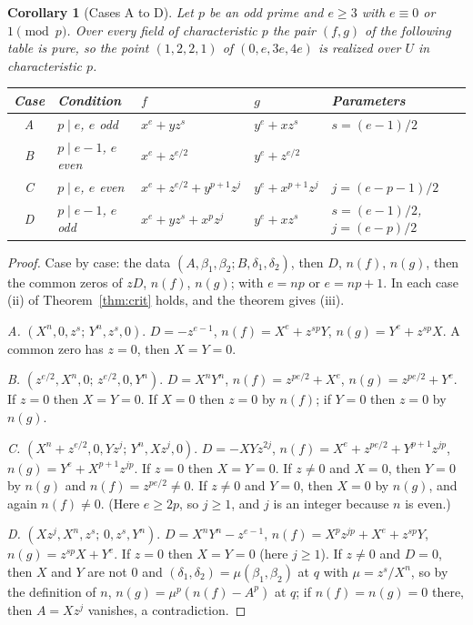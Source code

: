 \documentclass[11pt]{article}
\newtheorem{corollary}{Corollary}
\theoremstyle{definition}
\theoremstyle{remark}
\begin{document}
\begin{corollary}[Cases A to D]\label{cor:cases}
Let $p$ be an odd prime and $e\ge3$ with $e\equiv0$ or $1\pmod p$. Over every field of characteristic $p$ the pair $(f,g)$ of the following table is pure, so the point $(1,2,2,1)$ of $(0,e,3e,4e)$ is realized over $U$ in characteristic $p$.
\begin{center}\small
\begin{tabular}{@{}cllll@{}}
\toprule
Case & Condition & $f$ & $g$ & Parameters\\
\midrule
A & $p\mid e$, $e$ odd & $x^e+yz^s$ & $y^e+xz^s$ & $s=(e-1)/2$\\
B & $p\mid e-1$, $e$ even & $x^e+z^{e/2}$ & $y^e+z^{e/2}$ & \\
C & $p\mid e$, $e$ even & $x^e+z^{e/2}+y^{p+1}z^j$ & $y^e+x^{p+1}z^j$ & $j=(e-p-1)/2$\\
D & $p\mid e-1$, $e$ odd & $x^e+yz^s+x^pz^j$ & $y^e+xz^s$ & $s=(e-1)/2$, $j=(e-p)/2$\\
\bottomrule
\end{tabular}
\end{center}
\end{corollary}
\begin{proof}
Case by case: the data $(A,\beta_1,\beta_2;B,\delta_1,\delta_2)$, then $D$, $n(f)$, $n(g)$, then the common zeros of $zD$, $n(f)$, $n(g)$; with $e=np$ or $e=np+1$. In each case (ii) of Theorem~\ref{thm:crit} holds, and the theorem gives (iii).

\emph{A.} $(X^n,0,z^s;\,Y^n,z^s,0)$. $D=-z^{e-1}$, $n(f)=X^e+z^{sp}Y$, $n(g)=Y^e+z^{sp}X$. A common zero has $z=0$, then $X=Y=0$.

\emph{B.} $(z^{e/2},X^n,0;\,z^{e/2},0,Y^n)$. $D=X^nY^n$, $n(f)=z^{pe/2}+X^e$, $n(g)=z^{pe/2}+Y^e$. If $z=0$ then $X=Y=0$. If $X=0$ then $z=0$ by $n(f)$; if $Y=0$ then $z=0$ by $n(g)$.

\emph{C.} $(X^n+z^{e/2},0,Yz^j;\,Y^n,Xz^j,0)$. $D=-XYz^{2j}$, $n(f)=X^e+z^{pe/2}+Y^{p+1}z^{jp}$, $n(g)=Y^e+X^{p+1}z^{jp}$. If $z=0$ then $X=Y=0$. If $z\ne0$ and $X=0$, then $Y=0$ by $n(g)$ and $n(f)=z^{pe/2}\ne0$. If $z\ne0$ and $Y=0$, then $X=0$ by $n(g)$, and again $n(f)\ne0$. (Here $e\ge2p$, so $j\ge1$, and $j$ is an integer because $n$ is even.)

\emph{D.} $(Xz^j,X^n,z^s;\,0,z^s,Y^n)$. $D=X^nY^n-z^{e-1}$, $n(f)=X^pz^{jp}+X^e+z^{sp}Y$, $n(g)=z^{sp}X+Y^e$. If $z=0$ then $X=Y=0$ (here $j\ge1$). If $z\ne0$ and $D=0$, then $X$ and $Y$ are not $0$ and $(\delta_1,\delta_2)=\mu(\beta_1,\beta_2)$ at $q$ with $\mu=z^s/X^n$, so by the definition of $n$, $n(g)=\mu^p(n(f)-A^p)$ at $q$; if $n(f)=n(g)=0$ there, then $A=Xz^j$ vanishes, a contradiction.
\end{proof}
\end{document}
